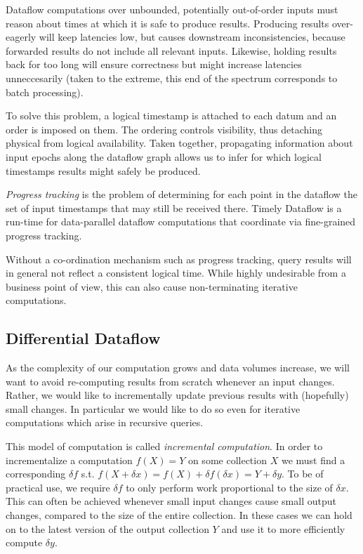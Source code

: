 \documentclass[../index.tex]{subfiles}
\begin{document}
Dataflow computations over unbounded, potentially out-of-order inputs
must reason about times at which it is safe to produce
results. Producing results over-eagerly will keep latencies low, but
causes downstream inconsistencies, because forwarded results do not
include all relevant inputs. Likewise, holding results back for too
long will ensure correctness but might increase latencies
unneccesarily (taken to the extreme, this end of the spectrum
corresponds to batch processing).

To solve this problem, a logical timestamp is attached to each datum
and an order is imposed on them. The ordering controls visibility,
thus detaching physical from logical availability. Taken together,
propagating information about input epochs along the dataflow graph
allows us to infer for which logical timestamps results might safely
be produced.

\emph{Progress tracking} is the problem of determining for each point
in the dataflow the set of input timestamps that may still be received
there. Timely Dataflow is a run-time for data-parallel dataflow
computations that coordinate via fine-grained progress tracking.

Without a co-ordination mechanism such as progress tracking, query
results will in general not reflect a consistent logical time. While
highly undesirable from a business point of view, this can also cause
non-terminating iterative computations.

\subsection{Differential Dataflow} \label{background-differential}

As the complexity of our computation grows and data volumes increase,
we will want to avoid re-computing results from scratch whenever an
input changes. Rather, we would like to incrementally update previous
results with (hopefully) small changes. In particular we would like to
do so even for iterative computations which arise in recursive
queries.

This model of computation is called \emph{incremental computation}. In
order to incrementalize a computation $f(X) = Y$ on some collection
$X$ we must find a corresponding $\delta{f}$ s.t. $f(X + \delta{x}) =
f(X) + \delta{f}(\delta{x}) = Y + \delta{y}$. To be of practical use,
we require $\delta{f}$ to only perform work proportional to the size
of $\delta{x}$. This can often be achieved whenever small input
changes cause small output changes, compared to the size of the entire
collection. In these cases we can hold on to the latest version of the
output collection $Y$ and use it to more efficiently compute
$\delta{y}$.
\end{document}
